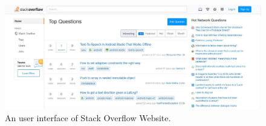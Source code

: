 \begin{figure}[hbt!]
	\centering
	\includegraphics[width=\linewidth]{figures/stackoverflow}
	\caption{An user interface of Stack Overflow Website. \cite{stackoverflow}}
	\label{fig:stackoverflow}
\end{figure}
